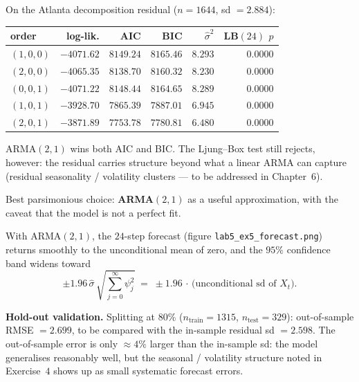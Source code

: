 \documentclass[a4paper,11pt]{article}
\begin{document}
\begin{exercise}\end{exercise}

\begin{solution}
On the Atlanta decomposition residual ($n = 1644$, sd $= 2.884$):
\begin{center}
\begin{tabular}{lrrrrr}
\toprule
order        & log-lik. & AIC      & BIC      & $\widehat\sigma^2$ & LB$(24)$ $p$ \\
\midrule
$(1,0,0)$    & $-4071.62$ & $8149.24$ & $8165.46$ & $8.293$ & $0.0000$ \\
$(2,0,0)$    & $-4065.35$ & $8138.70$ & $8160.32$ & $8.230$ & $0.0000$ \\
$(0,0,1)$    & $-4071.22$ & $8148.44$ & $8164.65$ & $8.289$ & $0.0000$ \\
$(1,0,1)$    & $-3928.70$ & $7865.39$ & $7887.01$ & $6.945$ & $0.0000$ \\
$(2,0,1)$    & $-3871.89$ & $\bm{7753.78}$ & $\bm{7780.81}$ & $6.480$ & $0.0000$ \\
\bottomrule
\end{tabular}
\end{center}
ARMA$(2, 1)$ wins both AIC and BIC. The Ljung--Box test still
rejects, however: the residual carries structure beyond what a
linear ARMA can capture (residual seasonality / volatility
clusters --- to be addressed in Chapter~6).

Best parsimonious choice: \textbf{ARMA$(2, 1)$} as a useful
approximation, with the caveat that the model is not a perfect
fit.
\end{solution}

\begin{exercise}[Forecasting]\end{exercise}

\begin{solution}
With ARMA$(2, 1)$, the $24$-step forecast (figure
\texttt{lab5\_ex5\_forecast.png}) returns smoothly to the
unconditional mean of zero, and the $95\%$ confidence band widens
toward
\[
  \pm 1.96\, \widehat\sigma\,
        \sqrt{\sum_{j = 0}^{\infty} \psi_j^2}
  \;=\; \pm 1.96\, \cdot \,\text{(unconditional sd of $X_t$)}.
\]

\textbf{Hold-out validation.} Splitting at $80\%$ ($n_{\text{train}}
= 1315$, $n_{\text{test}} = 329$): out-of-sample RMSE $= 2.699$,
to be compared with the in-sample residual sd $= 2.598$. The
out-of-sample error is only $\approx 4\%$ larger than the in-sample
sd: the model generalises reasonably well, but the seasonal /
volatility structure noted in Exercise~$4$ shows up as small
systematic forecast errors.
\end{solution}
\end{document}
